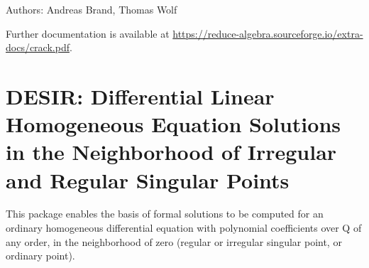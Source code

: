 Authors: Andreas Brand, Thomas Wolf

\begin{sloppypar}
  Further documentation is available at
  \url{https://reduce-algebra.sourceforge.io/extra-docs/crack.pdf}.
\end{sloppypar}

\iffalse
\newpage

\section{CVIT: Fast Calculation of Dirac Gamma Matrix Traces}
\indexpackage{CVIT}
\label{CVIT}

This package provides an alternative method for computing traces of Dirac
gamma matrices, based on an algorithm by Cvitanovich that treats gamma
matrices as 3-j symbols.

Authors: V.Ilyin, A.Kryukov, A.Rodionov, A.Taranov


\fi

\iffalse
\newpage

\section{DEFINT: A Definite Integration Interface}
\indexpackage{DEFINT}
\label{DEFINT}

This package finds the definite integral of an expression in a stated
interval.  It uses several techniques, including an innovative approach
based on the Meijer G-function, and contour integration.

Authors: Kerry Gaskell, Stanley M. Kameny, Winfried Neun


\fi

\newpage

\section{DESIR: Differential Linear Homogeneous Equation Solutions in the
              Neighborhood of Irregular and Regular Singular Points}

This package enables the basis of formal solutions to be computed for an
ordinary homogeneous differential equation with polynomial coefficients
over Q of any order, in the neighborhood of zero (regular or irregular
singular point, or ordinary point).

